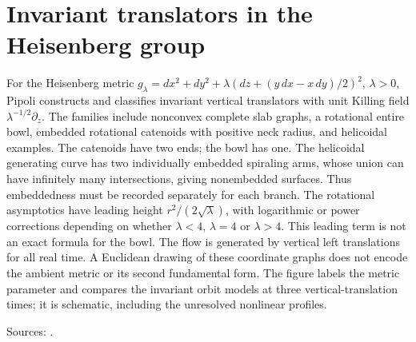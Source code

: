 \chapter{Invariant translators in the Heisenberg group}\label{sec:catalogue-nil-invariant-translators}
\begin{example}\label{ex:catalogue-nil-invariant-translators}
For the Heisenberg metric $g_\lambda=dx^2+dy^2+\lambda(dz+(y\,dx-x\,dy)/2)^2$, $\lambda>0$, Pipoli constructs and classifies invariant vertical translators with unit Killing field $\lambda^{-1/2}\partial_z$. The families include nonconvex complete slab graphs, a rotational entire bowl, embedded rotational catenoids with positive neck radius, and helicoidal examples. The catenoids have two ends; the bowl has one. The helicoidal generating curve has two individually embedded spiraling arms, whose union can have infinitely many intersections, giving nonembedded surfaces. Thus embeddedness must be recorded separately for each branch.
The rotational asymptotics have leading height $r^2/(2\sqrt\lambda)$, with logarithmic or power corrections depending on whether $\lambda<4$, $\lambda=4$ or $\lambda>4$. This leading term is not an exact formula for the bowl. The flow is generated by vertical left translations for all real time. A Euclidean drawing of these coordinate graphs does not encode the ambient metric or its second fundamental form. The figure labels the metric parameter and compares the invariant orbit models at three vertical-translation times; it is schematic, including the unresolved nonlinear profiles.
\par Sources: \cite{CatPipoli2018}.
\end{example}

